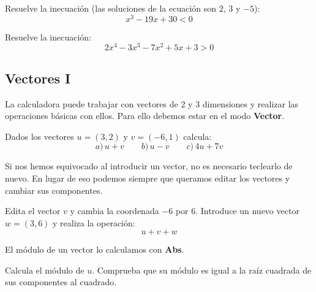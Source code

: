 \documentclass[12pt]{article}
\newenvironment{capitulo}{\begin{tcolorbox}[colback=blue!5!white,colframe=red!75!black]}{\end{tcolorbox}\bigskip}
\newenvironment{ejer}{\begin{tcolorbox}[center title, 
fonttitle=\sffamily\bfseries,colback=blue!5,colframe=orange]}{\end{tcolorbox}}
\begin{document}
\begin{ejer}

Resuelve la inecuación (las soluciones de la ecuación son $2$, $3$ y $-5$):
\[
x^3 - 19 x + 30<0
\]


\end{ejer}

\begin{ejer}

Resuelve la inecuación:
\[
2x^4-3x^3-7x^2+5x+3 >0
\]

\end{ejer}




\newpage

\begin{capitulo}
\section*{Vectores I}
\end{capitulo}

La calculadora puede trabajar con vectores de 2 y 3 dimensiones y realizar las operaciones básicas con ellos.  Para ello debemos estar en el modo \textbf{Vector}. 

\begin{ejer}

Dados los vectores $u=(3,2)$ y $v=(-6,1)$ calcula:
\[
 a) \, u+v  \qquad b)\,    u-v  \qquad c)\, 4u+7v 
 \]
 
\end{ejer}

Si nos hemos equivocado al introducir un vector, no es necesario teclearlo de nuevo. En lugar de eso podemos siempre que queramos editar los vectores y cambiar sus componentes.

\begin{ejer}

Edita el vector $v$ y cambia la coordenada $-6$ por $6$. Introduce un nuevo vector $w = (3,6)$ y realiza la operación:
\[
u+v+w
\]

\end{ejer}

El módulo de un vector lo calculamos con \textbf{Abs}.

\begin{ejer}

Calcula el módulo de $u$. Comprueba que su módulo es igual a la raíz cuadrada de sus componentes al cuadrado.

\end{ejer}
\end{document}
